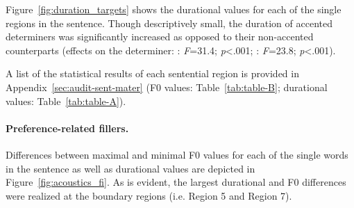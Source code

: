 \documentclass[fleqn,reqno,10pt,draft]{article}
\begin{document}
Figure~\ref{fig:duration_targets} shows the durational values 
for each of the single regions in the sentence. 
Though descriptively small, the duration of accented determiners 
was significantly increased as opposed to their non-accented counterparts 
(effects on
the determiner: : \emph{F}=31.4; \emph{p}<.001;
: \emph{F}=23.8; \emph{p}<.001).  



A list of the statistical results of each sentential region is provided in 
Appendix~\ref{sec:audit-sent-mater} (F0 values: Table~\ref{tab:table-B};
durational values: Table~\ref{tab:table-A}).


\paragraph{Preference-related fillers.} 
Differences between maximal and minimal F0 values for each of the
single words in the sentence as well as durational values are depicted in
Figure~\ref{fig:acoustics_fi}. As is
evident, the largest durational and F0 differences were
realized at the boundary regions (i.e. Region 5 and Region
7). 
\end{document}
